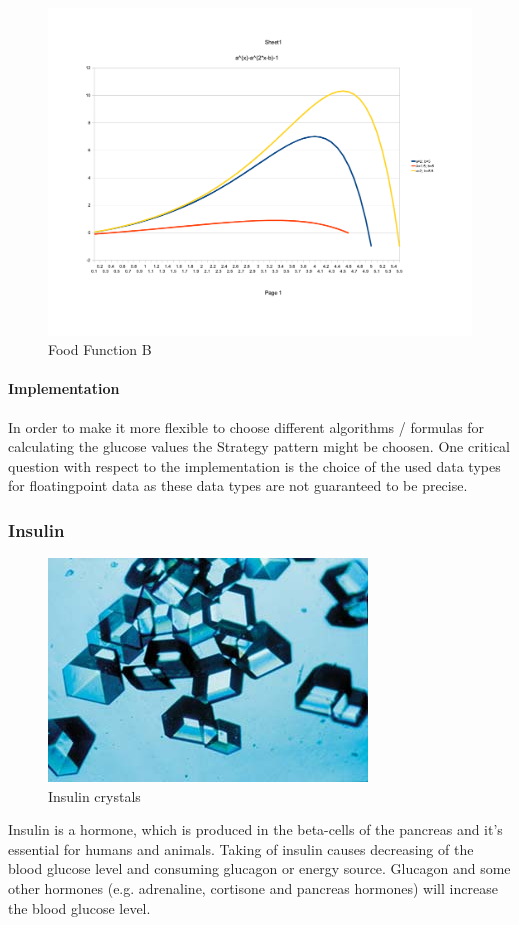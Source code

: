\begin{figure}[htb]
\centering
\includegraphics[scale=0.4]{images/food_function_b}
\caption{Food Function B}
\label{fig:food_function_b}
\end{figure}

\newpage
\paragraph{Implementation}
In order to make it more flexible to choose different algorithms / formulas for
calculating the glucose values the Strategy pattern might be choosen. One
critical question with respect to the implementation is the choice of the used
data types for floatingpoint data as these data types are not guaranteed to be precise.

\newpage
\subsubsection{Insulin}
\begin{figure}[htb]
\centering
\includegraphics[scale=0.4]{images/Insulincrystals.jpg}
\caption{Insulin crystals}
\end{figure}
Insulin is a hormone, which is produced in the beta-cells of the pancreas and it's essential for humans and animals. 
Taking of insulin causes decreasing of the blood glucose level and consuming glucagon or energy source. 
Glucagon and some other hormones (e.g. adrenaline, cortisone and pancreas hormones) will increase the blood glucose level.\\

